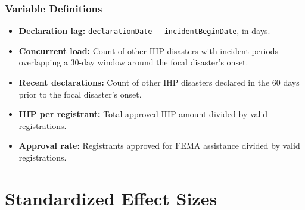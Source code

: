 \documentclass[12pt]{article}
\begin{document}
\subsubsection*{Variable Definitions}
\begin{itemize}
\item \textbf{Declaration lag:} \texttt{declarationDate} $-$ \texttt{incidentBeginDate}, in days.
\item \textbf{Concurrent load:} Count of other IHP disasters with incident periods overlapping a 30-day window around the focal disaster's onset.
\item \textbf{Recent declarations:} Count of other IHP disasters declared in the 60 days prior to the focal disaster's onset.
\item \textbf{IHP per registrant:} Total approved IHP amount divided by valid registrations.
\item \textbf{Approval rate:} Registrants approved for FEMA assistance divided by valid registrations.
\end{itemize}


\section{Standardized Effect Sizes}
\label{sec:sde}


\end{document}
